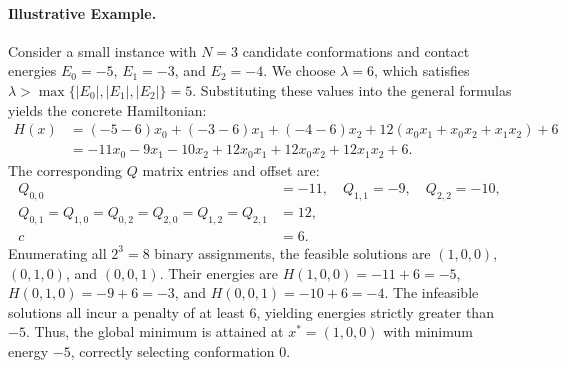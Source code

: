 \documentclass[12pt]{article}
\begin{document}
\paragraph{Illustrative Example.}
Consider a small instance with $N = 3$ candidate conformations and contact energies $E_0 = -5$, $E_1 = -3$, and $E_2 = -4$. We choose $\lambda = 6$, which satisfies $\lambda > \max\{|E_0|, |E_1|, |E_2|\} = 5$.
Substituting these values into the general formulas yields the concrete Hamiltonian:
\begin{align}
H(x) &= (-5 - 6)x_0 + (-3 - 6)x_1 + (-4 - 6)x_2 + 12(x_0 x_1 + x_0 x_2 + x_1 x_2) + 6 \\
&= -11x_0 - 9x_1 - 10x_2 + 12x_0 x_1 + 12x_0 x_2 + 12x_1 x_2 + 6.
\end{align}
The corresponding $Q$ matrix entries and offset are:
\begin{align}
Q_{0,0} &= -11, \quad Q_{1,1} = -9, \quad Q_{2,2} = -10, \\
Q_{0,1} = Q_{1,0} = Q_{0,2} = Q_{2,0} = Q_{1,2} = Q_{2,1} &= 12, \\
c &= 6.
\end{align}
Enumerating all $2^3 = 8$ binary assignments, the feasible solutions are $(1,0,0)$, $(0,1,0)$, and $(0,0,1)$. Their energies are $H(1,0,0) = -11 + 6 = -5$, $H(0,1,0) = -9 + 6 = -3$, and $H(0,0,1) = -10 + 6 = -4$. The infeasible solutions all incur a penalty of at least $6$, yielding energies strictly greater than $-5$. Thus, the global minimum is attained at $x^* = (1,0,0)$ with minimum energy $-5$, correctly selecting conformation $0$.
\end{document}
